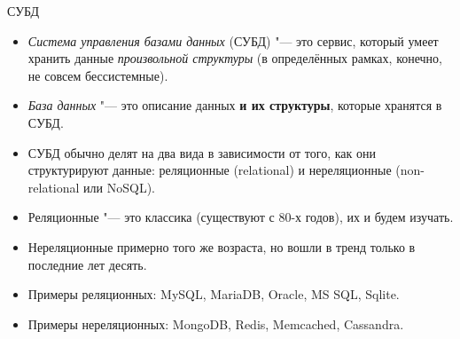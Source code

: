 \begin{frame}[t]{СУБД}
	\begin{itemize}
		\item \textit{Система управления базами данных} (СУБД) "--- это сервис, который умеет хранить данные \textit{произвольной структуры}
			(в определённых рамках, конечно, не совсем бессистемные).
		\item \textit{База данных} "--- это описание данных \textbf{и их структуры}, которые хранятся в СУБД.
		\item СУБД обычно делят на два вида в зависимости от того, как они структурируют данные: реляционные (relational) и нереляционные (non-relational или NoSQL).
		\item Реляционные "--- это классика (существуют с 80-х годов), их и будем изучать.
		\item Нереляционные примерно того же возраста, но вошли в тренд только в последние лет десять.
		\item Примеры реляционных: MySQL, MariaDB, Oracle, MS SQL, Sqlite.
		\item Примеры нереляционных: MongoDB, Redis, Memcached, Cassandra.
	\end{itemize}
\end{frame}
